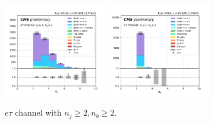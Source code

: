 \begin{figure}[ht]
    \includegraphics[width=0.4\textwidth]{chapters/Analysis/sectionPlots/figures/kinematics_pickles/etau/2b/etau_2b_nJets.pdf}
    \includegraphics[width=0.4\textwidth]{chapters/Analysis/sectionPlots/figures/kinematics_pickles/etau/2b/etau_2b_nBJets.pdf}
    
    \caption{$e\tau$ channel with $n_j\geq2, n_b\geq2$.}
\end{figure}


